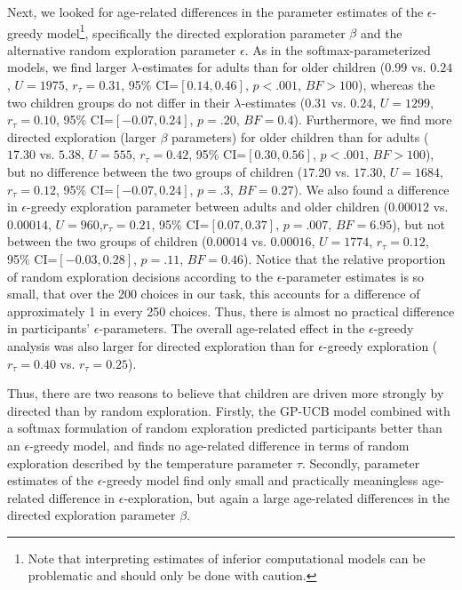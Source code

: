 Next, we looked for age-related differences in the parameter estimates of the $\epsilon$-greedy model\footnote{Note that interpreting estimates of inferior computational models can be problematic and should only be done with caution.}, specifically the directed exploration parameter $\beta$ and the alternative random exploration parameter $\epsilon$. As in the softmax-parameterized models, we find larger $\lambda$-estimates for adults than for older children ($0.99$ vs. $0.24$, $U = 1975$, $r_\tau=0.31$, 95\% CI=$[0.14, 0.46]$, $p<.001$, $BF>100$), whereas the two children groups do not differ in their $\lambda$-estimates ($0.31$ vs. $0.24$, $U = 1299$, $r_\tau=0.10$, 95\% CI=$[-0.07, 0.24]$, $p=.20$, $BF=0.4$). Furthermore, we find more directed exploration (larger $\beta$ parameters) for older children than for adults ($17.30$ vs. $5.38$, $U = 555$, $r_\tau=0.42$, 95\% CI=$[0.30, 0.56]$, $p<.001$, $BF>100$), but no difference between the two groups of children ($17.20$ vs. $17.30$, $U=1684$,$r_\tau=0.12$, 95\% CI=$[-0.07, 0.24]$, $p=.3$, $BF=0.27$). We also found a difference in $\epsilon$-greedy exploration parameter between adults and older children ($0.00012$ vs. $0.00014$, $U=960$,$r_\tau=0.21$, 95\% CI=$[0.07, 0.37]$, $p=.007$, $BF=6.95$), but not between the two groups of children ($0.00014$ vs. $0.00016$, $U= 1774$, $r_\tau=0.12$, 95\% CI=$[-0.03, 0.28]$, $p=.11$, $BF=0.46$).
Notice that the relative proportion of random exploration decisions according to the $\epsilon$-parameter estimates is so small, that over the 200 choices in our task, this accounts for a difference of approximately 1 in every 250 choices. Thus, there is almost no practical difference in participants' $\epsilon$-parameters. The overall age-related effect in the $\epsilon$-greedy analysis was also larger for directed exploration than for $\epsilon$-greedy exploration ($r_\tau=0.40$ vs. $r_\tau=0.25$). 

Thus, there are two reasons to believe that children are driven more strongly by directed than by random exploration. Firstly, the GP-UCB model combined with a softmax formulation of random exploration predicted participants better than an $\epsilon$-greedy model, and finds no age-related difference in terms of random exploration described by the temperature parameter $\tau$. Secondly, parameter estimates of the $\epsilon$-greedy model find only small and practically meaningless age-related difference in $\epsilon$-exploration, but again a large age-related differences in the directed exploration parameter $\beta$.


\clearpage